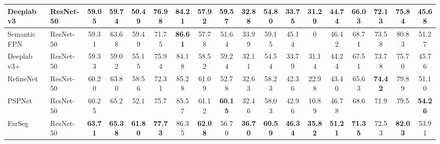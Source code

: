 \documentclass[10pt,twocolumn,letterpaper]{article}
\begin{document}
\begin{table*}[hbt]
{\begin{tabular}{l|l|c|ccccccccccccccc}
         Deeplab v3 \cite{chen2017rethinking} & ResNet-50                 & 59.05                      & 59.74                                      & 50.49          & 76.98          & 84.21          & 57.92          & 59.57          & 32.88          & 54.80          & 33.75          & 31.29          & 44.74          & 66.03          & 72.13          & 75.84          & 45.68          \\ \hline
         Semantic FPN \cite{kirillov2019panoptic}    & ResNet-50                 & 59.31                      & 63.68                                      & 59.49          & 71.75          & \textbf{86.61} & 57.78          & 51.64          & 33.99          & 59.15          & 45.14          & 0              & 46.42          & 68.71          & 73.58          & 80.83          & 51.27          \\ \hline
         Deeplab v3+ \cite{chen2018encoder}   & ResNet-50                 & 59.33                      & 59.02                                      & 55.15          & 75.94          & 84.18          & 58.52          & 59.24          & 32.11          & 54.54          & 33.79          & 31.14          & 44.24          & 67.51          & 73.78          & 75.70          & 45.76          \\ \hline
         RefineNet \cite{lin2017refinenet}    & ResNet-50                 & 60.20                      & 63.80                                      & 58.56          & 72.31          & 85.28          & 61.09          & 52.78          & 32.63          & 58.23          & 42.36          & 22.98          & 43.40          & 65.63          & \textbf{74.42} & 79.89          & 51.10          \\ \hline
         PSPNet \cite{zhao2017pyramid}        & ResNet-50                 & 60.25                      & 65.2                                       & 52.1           & 75.7           & 85.57          & 61.12          & \textbf{60.15} & 32.46          & 58.03          & 42.96          & 10.89          & 46.78          & 68.6           & 71.9           & 79.5           & \textbf{54.26} \\ \hline\hline
         FarSeg                               & ResNet-50                 & \textbf{63.71}             & \textbf{65.38}                             & \textbf{61.80} & \textbf{77.73} & 86.35          & \textbf{62.08} & 56.70          & \textbf{36.70} & \textbf{60.59} & \textbf{46.34} & \textbf{35.82} & \textbf{51.21} & \textbf{71.35} & 72.53          & \textbf{82.03} & 53.91          \\ \hline
      \end{tabular}
   }
\end{table*}
\end{document}
